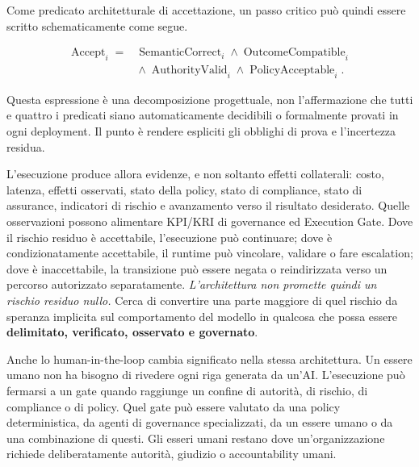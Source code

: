\documentclass[10pt,oneside,openany]{book}
\begin{document}
Come predicato architetturale di accettazione, un passo critico può quindi essere scritto schematicamente come segue.
\begin{formulabox}
\[
\begin{aligned}
\operatorname{Accept}_i ={}&
\operatorname{SemanticCorrect}_i \land
\operatorname{OutcomeCompatible}_i\\
&{}\land \operatorname{AuthorityValid}_i \land
\operatorname{PolicyAcceptable}_i.
\end{aligned}
\]
\end{formulabox}
Questa espressione è una decomposizione progettuale, non l'affermazione che tutti e quattro i predicati siano automaticamente decidibili o formalmente provati in ogni deployment. Il punto è rendere espliciti gli obblighi di prova e l'incertezza residua.

L'esecuzione produce allora evidenze, e non soltanto effetti collaterali: costo, latenza, effetti osservati, stato della policy, stato di compliance, stato di assurance, indicatori di rischio e avanzamento verso il risultato desiderato. Quelle osservazioni possono alimentare KPI/KRI di governance ed Execution Gate. Dove il rischio residuo è accettabile, l'esecuzione può continuare; dove è condizionatamente accettabile, il runtime può vincolare, validare o fare escalation; dove è inaccettabile, la transizione può essere negata o reindirizzata verso un percorso autorizzato separatamente. \emph{L'architettura non promette quindi un rischio residuo nullo.} Cerca di convertire una parte maggiore di quel rischio da speranza implicita sul comportamento del modello in qualcosa che possa essere \textbf{delimitato, verificato, osservato e governato}.

Anche lo human-in-the-loop cambia significato nella stessa architettura. Un essere umano non ha bisogno di rivedere ogni riga generata da un'AI. L'esecuzione può fermarsi a un gate quando raggiunge un confine di autorità, di rischio, di compliance o di policy. Quel gate può essere valutato da una policy deterministica, da agenti di governance specializzati, da un essere umano o da una combinazione di questi. Gli esseri umani restano dove un'organizzazione richiede deliberatamente autorità, giudizio o accountability umani.
\end{document}
